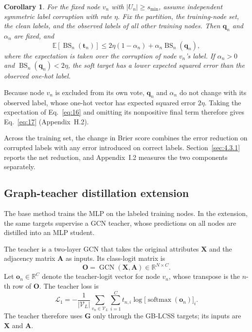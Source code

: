 \documentclass[times,review,10pt]{elsarticle}
\theoremstyle{definition}
\theoremstyle{plain}
\newtheorem{corollary}{Corollary}
\begin{document}
\begin{corollary}\label{cor:expected}
For the fixed node \(v_n\) with \(|U_n|\geq s_{\min}\), assume independent symmetric label corruption with rate \(\eta\). Fix the partition, the training-node set, the clean labels, and the observed labels of all other training nodes. Then \(\mathbf q_n\) and \(\alpha_n\) are fixed, and
\begin{equation}\label{eq:17}
\mathbb E[\operatorname{BS}_n(\mathbf t_n)]\leq2\eta(1-\alpha_n)+\alpha_n\operatorname{BS}_n(\mathbf q_n),
\end{equation}
where the expectation is taken over the corruption of node \(v_n\)'s label. If \(\alpha_n>0\) and \(\operatorname{BS}_n(\mathbf q_n)<2\eta\), the soft target has a lower expected squared error than the observed one-hot label.
\end{corollary}

Because node \(v_n\) is excluded from its own vote, \(\mathbf q_n\) and \(\alpha_n\) do not change with its observed label, whose one-hot vector has expected squared error \(2\eta\). Taking the expectation of Eq.~\eqref{eq:16} and omitting its nonpositive final term therefore gives Eq.~\eqref{eq:17} (Appendix~H.2).

Across the training set, the change in Brier score combines the error reduction on corrupted labels with any error introduced on correct labels. Section~\ref{sec:4.3.1} reports the net reduction, and Appendix~I.2 measures the two components separately.

\subsection{Graph-teacher distillation extension}\label{sec:3.5}

The base method trains the MLP on the labeled training nodes. In the extension, the same targets supervise a GCN teacher, whose predictions on all nodes are distilled into an MLP student.

The teacher is a two-layer GCN that takes the original attributes \(\mathbf X\) and the adjacency matrix \(\mathbf A\) as inputs. Its class-logit matrix is
\begin{equation}\label{eq:18}
\mathbf O=\operatorname{GCN}(\mathbf X,\mathbf A)\in\mathbb R^{N\times C}.
\end{equation}
Let \(\mathbf o_n\in\mathbb R^C\) denote the teacher-logit vector for node \(v_n\), whose transpose is the \(n\)-th row of \(\mathbf O\). The teacher loss is
\begin{equation}\label{eq:19}
\mathcal L_1=-\frac{1}{|\mathcal V_L|}\sum_{v_n\in\mathcal V_L}\sum_{i=1}^C t_{n,i}\log\bigl[\operatorname{softmax}(\mathbf o_n)\bigr]_i.
\end{equation}
The teacher therefore uses \(\mathbf G\) only through the GB-LCSS targets; its inputs are \(\mathbf X\) and \(\mathbf A\).
\end{document}
